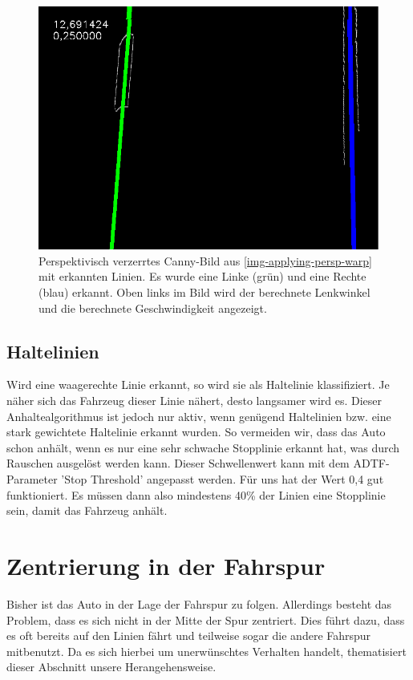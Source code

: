 \documentclass[a4paper,12pt]{report}
\begin{document}
	\begin{figure}
		\centering
		\includegraphics[width=.5\textwidth]{assets/Strasse-Final}
		\caption{Perspektivisch verzerrtes Canny-Bild aus \autoref{img-applying-persp-warp} mit erkannten Linien.
			Es wurde eine Linke (grün) und eine Rechte (blau) erkannt. Oben links im Bild wird der berechnete Lenkwinkel und die berechnete Geschwindigkeit angezeigt.}
		\label{img-lines}
	\end{figure}


\subsection{Haltelinien}

	Wird eine waagerechte Linie erkannt, so wird sie als Haltelinie klassifiziert.
	Je näher sich das Fahrzeug dieser Linie nähert, desto langsamer wird es.
	Dieser Anhaltealgorithmus ist jedoch nur aktiv, wenn genügend Haltelinien bzw. eine stark gewichtete Haltelinie erkannt wurden.
	So vermeiden wir, dass das Auto schon anhält, wenn es nur eine sehr schwache Stopplinie erkannt hat, was durch Rauschen ausgelöst werden kann.
	Dieser Schwellenwert kann mit dem ADTF-Parameter 'Stop Threshold' angepasst werden.
	Für uns hat der Wert 0,4 gut funktioniert.
	Es müssen dann also mindestens 40\% der Linien eine Stopplinie sein, damit das Fahrzeug anhält. %

\section{Zentrierung in der Fahrspur}

	Bisher ist das Auto in der Lage der Fahrspur zu folgen.
	Allerdings besteht das Problem, dass es sich nicht in der Mitte der Spur zentriert.
	Dies führt dazu, dass es oft bereits auf den Linien fährt und teilweise sogar die andere Fahrspur mitbenutzt.
	Da es sich hierbei um unerwünschtes Verhalten handelt, thematisiert dieser Abschnitt unsere Herangehensweise.
\end{document}
